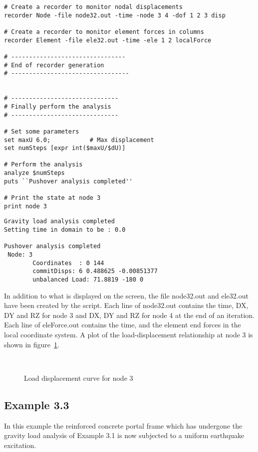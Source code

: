 \documentclass[12pt]{article}
\begin{document}
{\begin{verbatim}
# Create a recorder to monitor nodal displacements
recorder Node -file node32.out -time -node 3 4 -dof 1 2 3 disp

# Create a recorder to monitor element forces in columns
recorder Element -file ele32.out -time -ele 1 2 localForce

# --------------------------------
# End of recorder generation
# ---------------------------------


# ------------------------------
# Finally perform the analysis
# ------------------------------

# Set some parameters
set maxU 6.0;	        # Max displacement
set numSteps [expr int($maxU/$dU)]

# Perform the analysis
analyze $numSteps
puts ``Pushover analysis completed''

# Print the state at node 3
print node 3
\end{verbatim}
}


\pagebreak
{}

{\sf\small
\begin{verbatim}
Gravity load analysis completed
Setting time in domain to be : 0.0

Pushover analysis completed
 Node: 3
        Coordinates  : 0 144 
        commitDisps: 6 0.488625 -0.00851377 
        unbalanced Load: 71.8819 -180 0 
\end{verbatim}
}

In addition to what is displayed on the screen, the file
node32.out and ele32.out have been 
created by the script. Each line of node32.out contains the time,
DX, DY and RZ for node 3 and DX, DY and RZ for node 4 at the end of an
iteration. Each line of eleForce.out contains the time,
and the element end forces in the local coordinate system.
A plot of  the load-displacement relationship at node 3 is shown in
figure~\ref{lateral32}.


\begin{figure}[htpb]
\begin{center}
\leavevmode
\hbox{%
\epsfxsize=4.0in
}
\end{center}
\caption{Load displacement curve for node 3}
\label{lateral32}
\end{figure}

\pagebreak
\subsection{Example 3.3}
In this example the reinforced concrete portal frame which
has undergone the gravity load analysis of Example 3.1 is now
subjected to a uniform earthquake excitation.
\end{document}
